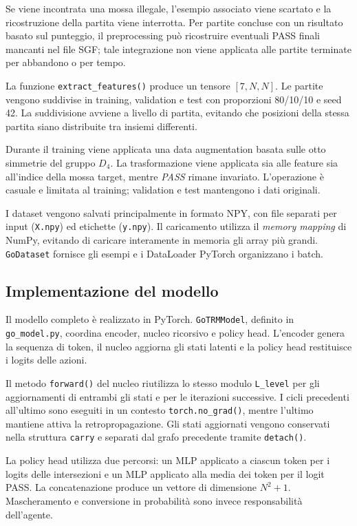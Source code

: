 Se viene incontrata una mossa illegale, l'esempio associato viene scartato e la ricostruzione della partita viene interrotta. Per partite concluse con un risultato basato sul punteggio, il preprocessing può ricostruire eventuali PASS finali mancanti nel file SGF; tale integrazione non viene applicata alle partite terminate per abbandono o per tempo.

La funzione \texttt{extract\_features()} produce un tensore $[7,N,N]$. Le partite vengono suddivise in training, validation e test con proporzioni 80/10/10 e seed 42. La suddivisione avviene a livello di partita, evitando che posizioni della stessa partita siano distribuite tra insiemi differenti.

Durante il training viene applicata una data augmentation basata sulle otto simmetrie del gruppo $D_4$. La trasformazione viene applicata sia alle feature sia all'indice della mossa target, mentre \textit{PASS} rimane invariato. L'operazione è casuale e limitata al training; validation e test mantengono i dati originali.

I dataset vengono salvati principalmente in formato NPY, con file separati per input (\texttt{X.npy}) ed etichette (\texttt{y.npy}). Il caricamento utilizza il \textit{memory mapping} di NumPy, evitando di caricare interamente in memoria gli array più grandi. \texttt{GoDataset} fornisce gli esempi e i DataLoader PyTorch organizzano i batch.

\subsection{Implementazione del modello}

Il modello completo è realizzato in PyTorch. \texttt{GoTRMModel}, definito in \texttt{go\_model.py}, coordina encoder, nucleo ricorsivo e policy head. L'encoder genera la sequenza di token, il nucleo aggiorna gli stati latenti e la policy head restituisce i logits delle azioni.

Il metodo \texttt{forward()} del nucleo riutilizza lo stesso modulo \texttt{L\_level} per gli aggiornamenti di entrambi gli stati e per le iterazioni successive. I cicli precedenti all'ultimo sono eseguiti in un contesto \texttt{torch.no\_grad()}, mentre l'ultimo mantiene attiva la retropropagazione. Gli stati aggiornati vengono conservati nella struttura \texttt{carry} e separati dal grafo precedente tramite \texttt{detach()}.

La policy head utilizza due percorsi: un MLP applicato a ciascun token per i logits delle intersezioni e un MLP applicato alla media dei token per il logit PASS. La concatenazione produce un vettore di dimensione $N^2+1$. Mascheramento e conversione in probabilità sono invece responsabilità dell'agente.

